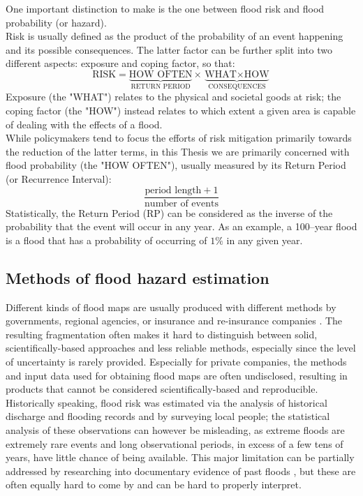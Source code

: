 One important distinction to make is the one between flood risk and flood probability (or hazard).\\
Risk is usually defined \citep[see e.g.][]{Kron2002, DeMoel2009, Merz2007} as the product of the probability of an event happening and its possible consequences. The latter factor can be further split into two different aspects: exposure and coping factor, so that:
$$\text{RISK} = \underbrace{\text{HOW OFTEN}}_\text{RETURN PERIOD} \times \underbrace{\text{WHAT} \times \text{HOW}}_\text{CONSEQUENCES}$$
Exposure (the "WHAT") relates to the physical and societal goods at risk; the coping factor (the "HOW") instead relates to which extent a given area is capable of dealing with the effects of a flood.\\
While policymakers tend to focus the efforts of risk mitigation primarily towards the reduction of the latter terms, in this Thesis we are primarily concerned with flood probability (the "HOW OFTEN"), usually measured by its Return Period (or Recurrence Interval):
$$\frac{\text{period length} + 1}{\text{number of events}}$$
Statistically, the Return Period (RP) can be considered as the inverse of the probability that the event will occur in any year. As an example, a 100--year flood is a flood that has a probability of occurring of $1\%$ in any given year.

\subsection{Methods of flood hazard estimation}\label{subs:flood_hazard_methods}
Different kinds of flood maps are usually produced with different methods by governments, regional agencies, or insurance and re-insurance companies \citep{DeMoel2009}. The resulting fragmentation often makes it hard to distinguish between solid, scientifically-based approaches and less reliable methods, especially since the level of uncertainty is rarely provided. Especially for private companies, the methods and input data used for obtaining flood maps are often undisclosed, resulting in products that cannot be considered scientifically-based and reproducible.\\

Historically speaking, flood risk was estimated via the analysis of historical discharge and flooding records and by surveying local people; the statistical analysis of these observations can however be misleading, as extreme floods are extremely rare events and long observational periods, in excess of a few tens of years, have little chance of being available. This major limitation can be partially addressed by researching into documentary evidence of past floods \citep{Kjeldsen2014, Reed2002}, but these are often equally hard to come by and can be hard to properly interpret.\\

